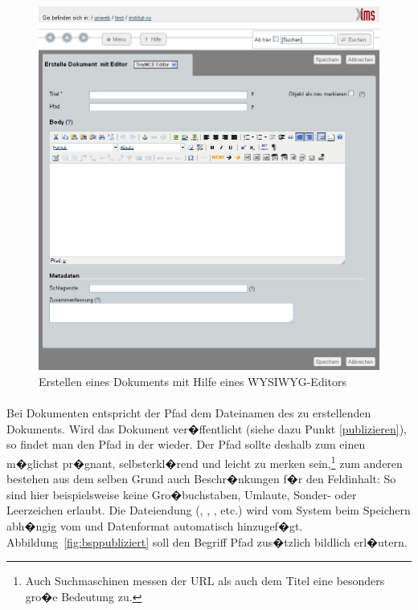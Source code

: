 \begin{figure}[!ht]
  \centering
  \includegraphics[width=\textwidth]{./images/tinymce-full.png}
  \caption{Erstellen eines Dokuments mit Hilfe eines WYSIWYG-Editors}
  \label{fig:dokumentwysiwyg}
\end{figure}

\paragraph{}
\label{location}

Bei Dokumenten entspricht 
der Pfad dem Dateinamen des
zu erstellenden Dokuments. Wird das Dokument ver�ffentlicht (siehe
dazu Punkt \ref{publizieren}), so findet man 
den Pfad
in der  wieder. 
Der Pfad
sollte deshalb
zum einen m�glichst pr�gnant, selbsterkl�rend und leicht zu merken
sein,\footnote{Auch Suchmaschinen messen der URL als auch dem Titel
  eine besonders gro�e Bedeutung zu.} zum anderen bestehen aus dem
selben Grund auch Beschr�nkungen f�r den Feldinhalt: So sind hier
beispielsweise keine Gro�buchstaben, Umlaute, Sonder- oder Leerzeichen erlaubt. Die
Dateiendung (, , , etc.) wird vom
System beim Speichern abh�ngig vom  und
Datenformat automatisch hinzugef�gt. Abbildung~\ref{fig:bsppubliziert}
soll den Begriff 
Pfad 
zus�tzlich bildlich erl�utern.



